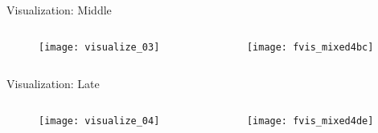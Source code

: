 \begin{frame}{Visualization: Middle}

  \begin{columns}
    \begin{column}{0.1\textwidth}
      \begin{figure}
        \texttt{[image: visualize\_03]}
      \end{figure}
    \end{column}
    \begin{column}{0.9\textwidth}
      \begin{figure}
        \texttt{[image: fvis\_mixed4bc]}
      \end{figure}
    \end{column}
  \end{columns}

  \note{
    \begin{itemize}
      \item
      \item
    \end{itemize}
  }
\end{frame}



\begin{frame}{Visualization: Late}

  \begin{columns}
    \begin{column}{0.1\textwidth}
      \begin{figure}
        \texttt{[image: visualize\_04]}
      \end{figure}
    \end{column}
    \begin{column}{0.9\textwidth}
      \begin{figure}
        \texttt{[image: fvis\_mixed4de]}
      \end{figure}
    \end{column}
  \end{columns}

  \note{
    \begin{itemize}
      \item
      \item
    \end{itemize}
  }
\end{frame}
